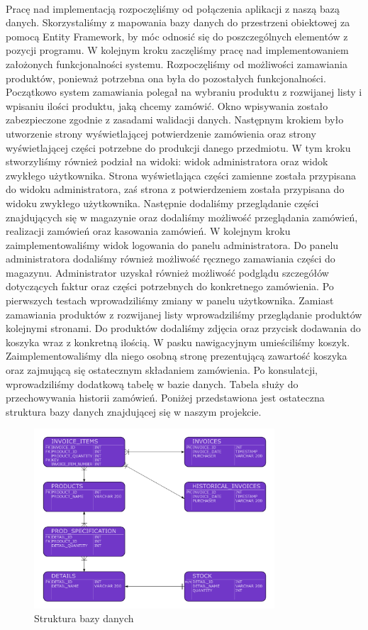 \documentclass{article}
\begin{document}
\paragraph{}
Pracę nad implementacją rozpoczęliśmy od połączenia aplikacji z naszą bazą danych.
Skorzystaliśmy z mapowania bazy danych do przestrzeni obiektowej za pomocą Entity Framework, by móc odnosić
się do poszczególnych elementów z pozycji programu.
W kolejnym kroku zaczęliśmy pracę nad implementowaniem założonych funkcjonalności systemu.
Rozpoczęliśmy od możliwości zamawiania produktów, ponieważ potrzebna ona była do pozostałych
funkcjonalności. Początkowo system zamawiania polegał na wybraniu produktu z rozwijanej listy i
wpisaniu ilości produktu, jaką chcemy zamówić. Okno wpisywania zostało zabezpieczone zgodnie z
zasadami walidacji danych.
Następnym krokiem było utworzenie strony wyświetlającej potwierdzenie zamówienia oraz strony
wyświetlającej części potrzebne do produkcji danego przedmiotu. W tym kroku stworzyliśmy również
podział na widoki: widok administratora oraz widok zwykłego użytkownika. Strona wyświetlająca części
zamienne została przypisana do widoku administratora, zaś strona z potwierdzeniem została przypisana do
widoku zwykłego użytkownika. Następnie dodaliśmy przeglądanie części znajdujących się w magazynie
oraz dodaliśmy możliwość przeglądania zamówień, realizacji zamówień oraz kasowania zamówień.
W kolejnym kroku zaimplementowaliśmy widok logowania do panelu administratora. Do panelu administratora
dodaliśmy również możliwość ręcznego zamawiania części do magazynu. Administrator uzyskał również
możliwość podglądu szczegółów dotyczących faktur oraz części potrzebnych do konkretnego zamówienia.
Po pierwszych testach wprowadziliśmy zmiany w panelu użytkownika. Zamiast zamawiania produktów z
rozwijanej listy wprowadziliśmy przeglądanie produktów kolejnymi stronami. Do produktów dodaliśmy
zdjęcia oraz przycisk dodawania do koszyka wraz z konkretną ilością. W pasku nawigacyjnym
umieściliśmy koszyk. Zaimplementowaliśmy dla niego osobną stronę prezentującą zawartość koszyka oraz
zajmującą się ostatecznym składaniem zamówienia. Po konsulatcji, wprowadziliśmy dodatkową tabelę w
bazie danych. Tabela służy do przechowywania historii zamówień.
Poniżej przedstawiona jest ostateczna struktura bazy danych znajdującej się w naszym projekcie.
\begin{figure}[H]
   \centering
   \includegraphics[width=0.8\textwidth,frame]{diagram_f.png}
   \caption{Struktura bazy danych}
\end{figure}
\end{document}
